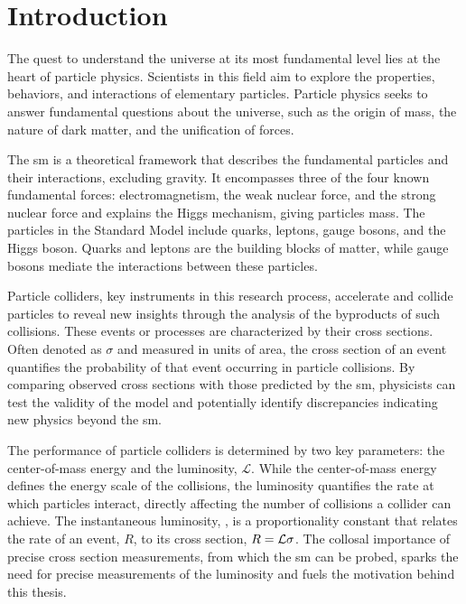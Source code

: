 \chapter{Introduction}


The quest to understand the universe at its most fundamental level lies at the heart of particle physics. Scientists in this field aim to explore the properties, behaviors, and interactions of elementary particles. Particle physics seeks to answer fundamental questions about the universe, such as the origin of mass, the nature of dark matter, and the unification of forces.

The \acrfull{sm} is a theoretical framework that describes the fundamental particles and their interactions, excluding gravity. It encompasses three of the four known fundamental forces: electromagnetism, the weak nuclear force, and the strong nuclear force and explains the Higgs mechanism, giving particles mass. The particles in the Standard Model include quarks, leptons, gauge bosons, and the Higgs boson. Quarks and leptons are the building blocks of matter, while gauge bosons mediate the interactions between these particles.

Particle colliders, key instruments in this research process, accelerate and collide particles to reveal new insights through the analysis of the byproducts of such collisions. These events or processes are characterized by their cross sections. Often denoted as $\sigma$ and measured in units of area, the cross section of an event quantifies the probability of that event occurring in particle collisions. By comparing observed cross sections with those predicted by the \acrshort{sm}, physicists can test the validity of the model and potentially identify discrepancies indicating new physics beyond the \acrshort{sm}.

The performance of particle colliders is determined by two key parameters: the center-of-mass energy and the luminosity, $\mathcal{L}$. While the center-of-mass energy defines the energy scale of the collisions, the luminosity quantifies the rate at which particles interact, directly affecting the number of collisions a collider can achieve. The instantaneous luminosity, \ilum, is a proportionality constant that relates the rate of an event, $R$, to its cross section, $R = \mathcal{L} \sigma$. The collosal importance of precise cross section measurements, from which the \acrshort{sm} can be probed, sparks the need for precise measurements of the luminosity and fuels the motivation behind this thesis.

